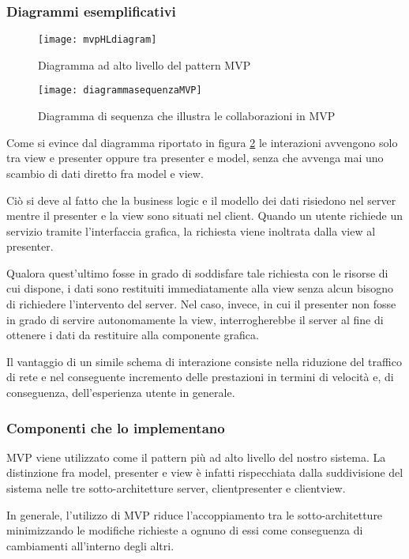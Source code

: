 \subsubsection{Diagrammi esemplificativi}
\begin{figure}[H]
\centering
\texttt{[image: mvpHLdiagram]}
\caption{Diagramma ad alto livello del pattern MVP}\label{fig:mvpHL}
\end{figure}

\begin{figure}[H]
\centering
\texttt{[image: diagrammasequenzaMVP]}
\caption{Diagramma di sequenza che illustra le collaborazioni in MVP}\label{fig:mvpSD}
\end{figure}

Come si evince dal diagramma riportato in figura \ref{fig:mvpSD} le interazioni avvengono solo tra view e presenter oppure tra presenter e model, senza che avvenga mai uno scambio di dati diretto fra model e view.

Ciò si deve al fatto che la business logic e il modello dei dati risiedono nel server mentre il presenter e la view sono situati nel client. Quando un utente richiede un servizio tramite l'interfaccia grafica, la richiesta viene inoltrata dalla view al presenter.

Qualora quest'ultimo fosse in grado di soddisfare tale richiesta con le risorse di cui dispone, i dati sono restituiti immediatamente alla view senza alcun bisogno di richiedere l'intervento del server. Nel caso, invece, in cui il presenter non fosse in grado di servire autonomamente la view, interrogherebbe il server al fine di ottenere i dati da restituire alla componente grafica.

Il vantaggio di un simile schema di interazione consiste nella riduzione del traffico di rete e nel conseguente incremento delle prestazioni in termini di velocità e, di conseguenza, dell'esperienza utente in generale.

\subsubsection{Componenti che lo implementano}
MVP viene utilizzato come il pattern più ad alto livello del nostro sistema. La distinzione fra model, presenter e view è infatti rispecchiata dalla suddivisione del sistema nelle tre sotto-architetture server, clientpresenter e clientview.

In generale, l'utilizzo di MVP riduce l'accoppiamento tra le sotto-architetture minimizzando le modifiche richieste a ognuno di essi come conseguenza di cambiamenti all'interno degli altri.

